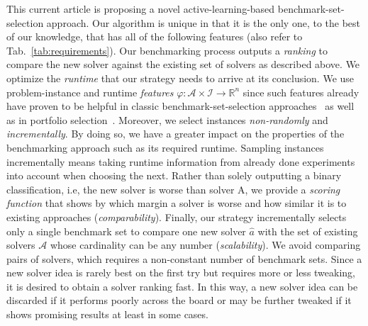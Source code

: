 \documentclass[runningheads]{llncs}
\begin{document}
This current article is proposing a novel active-learning-based benchmark-set-selection approach.
Our algorithm is unique in that it is the only one, to the best of our knowledge, that has all of the following features (also refer to Tab.~\ref{tab:requirements}).
Our benchmarking process outputs a \emph{ranking} to compare the new solver against the existing set of solvers as described above.
We optimize the \emph{runtime} that our strategy needs to arrive at its conclusion.
We use problem-instance and runtime \emph{features} $\varphi\!: \mathcal{A} \times \mathcal{I} \rightarrow \mathbb{R}^n$ since such features already have proven to be helpful in classic benchmark-set-selection approaches~\cite{HoosKSS13} as well as in portfolio selection~\cite{CollauttiMMO13,NgokoCT19}.
Moreover, we select instances \emph{non-randomly} and \emph{incrementally}.
By doing so, we have a greater impact on the properties of the benchmarking approach such as its required runtime.
Sampling instances incrementally means taking runtime information from already done experiments into account when choosing the next.
Rather than solely outputting a binary classification, i.e, the new solver is worse than solver A, we provide a \emph{scoring function} that shows by which margin a solver is worse and how similar it is to existing approaches (\emph{comparability}).
Finally, our strategy incrementally selects only a single benchmark set to compare one new solver $\hat{a}$ with the set of existing solvers $\mathcal{A}$ whose cardinality can be any number (\emph{scalability}).
We avoid comparing pairs of solvers, which requires a non-constant number of benchmark sets.
Since a new solver idea is rarely best on the first try but requires more or less tweaking, it is desired to obtain a solver ranking fast.
In this way, a new solver idea can be discarded if it performs poorly across the board or may be further tweaked if it shows promising results at least in some cases.
\end{document}
